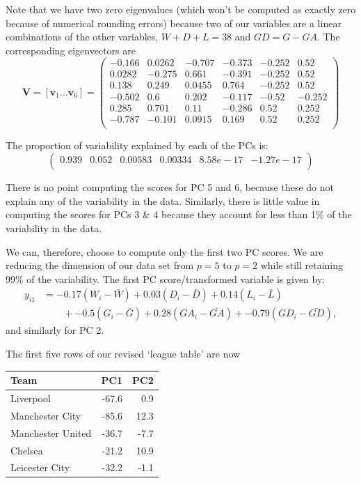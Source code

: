 \documentclass[
]{book}
\theoremstyle{definition}
\theoremstyle{definition}
\theoremstyle{definition}
\theoremstyle{definition}
\theoremstyle{remark}
\begin{document}
Note that we have two zero eigenvalues (which won't be computed as exactly zero because of numerical rounding errors) because two of our variables are a linear combinations of the other variables, \(W+D+L = 38\) and \(GD=G-GA\). The corresponding eigenvectors are
\[\mathbf V= [\mathbf v_1 \ldots \mathbf v_6] =\begin{pmatrix}-0.166&0.0262&-0.707&-0.373&-0.252&0.52 \\0.0282&-0.275&0.661&-0.391&-0.252&0.52 \\0.138&0.249&0.0455&0.764&-0.252&0.52 \\-0.502&0.6&0.202&-0.117&-0.52&-0.252 \\0.285&0.701&0.11&-0.286&0.52&0.252 \\-0.787&-0.101&0.0915&0.169&0.52&0.252 \\\end{pmatrix}\]

The proportion of variability explained by each of the PCs is:
\[
\begin{pmatrix}0.939&0.052&0.00583&0.00334&8.58e-17&-1.27e-17 \\\end{pmatrix}
\]

There is no point computing the scores for PC 5 and 6, because these do not explain any of the variability in the data. Similarly, there is little value in computing the scores for PCs 3 \& 4 because they account for less than 1\% of the variability in the data.

We can, therefore, choose to compute only the first two PC scores. We are reducing the dimension of our data set from \(p=5\) to \(p=2\) while still retaining 99\% of the variability. The first PC score/transformed variable is given by:
\begin{align*}
y_{i1} &= -0.17(W_i-\bar{W}) +0.03(D_i-\bar{D}) +0.14(L_i-\bar{L})\\
& \qquad +-0.5(G_i-\bar{G}) +0.28(GA_i-\bar{GA})+-0.79(GD_i-\bar{GD}),
\end{align*}
and similarly for PC 2.

The first five rows of our revised `league table' are now

\begin{table}
\centering
\begin{tabular}{lrr}
\toprule
Team & PC1 & PC2\\
\midrule
Liverpool & -67.6 & 0.9\\
Manchester City & -85.6 & 12.3\\
Manchester United & -36.7 & -7.7\\
Chelsea & -21.2 & 10.9\\
Leicester City & -32.2 & -1.1\\
\bottomrule
\end{tabular}
\end{table}
\end{document}
